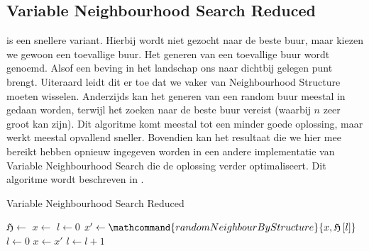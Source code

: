 \subsection{Variable Neighbourhood Search Reduced}
 is een snellere variant. Hierbij wordt niet gezocht naar de beste buur, maar kiezen we gewoon een toevallige buur. Het generen van een toevallige buur wordt  genoemd. Alsof een beving in het landschap ons naar dichtbij gelegen punt brengt. Uiteraard leidt dit er toe dat we vaker van Neighbourhood Structure moeten wisselen. Anderzijds kan het generen van een random buur meestal in  gedaan worden, terwijl het zoeken naar de beste buur  vereist (waarbij $n$ zeer groot kan zijn). Dit algoritme komt meestal tot een minder goede oplossing, maar werkt meestal opvallend sneller. Bovendien kan het resultaat die we hier mee bereikt hebben opnieuw ingegeven worden in een andere implementatie van Variable Neighbourhood Search die de oplossing verder optimaliseert. Dit algoritme wordt beschreven in .
\begin{algorithm}[htb]                      %
\caption{Variable Neighbourhood Search Reduced}          %
\label{alg:variableNeighbourhoodSearchReduced}                           %
\begin{algorithmic}[1]                    %
\STATE $\mathfrak{H}\leftarrow$
\STATE $x\leftarrow$
\STATE $l\leftarrow 0$
\STATE $x'\leftarrow\mathcommand{randomNeighbourByStructure}{x,\mathfrak{H}\left[l\right]}$
\STATE $l\leftarrow 0$
\STATE $x\leftarrow x'$
\ELSE
\STATE $l\leftarrow l+1$
\ENDIF
\ENDWHILE
\end{algorithmic}
\end{algorithm}
